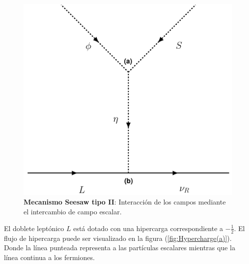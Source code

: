 \documentclass[12pt]{article}
\begin{document}
\begin{figure}[h!]
  \begin{center}
  \includegraphics[scale=0.6]{DiracSeeSAWdiagram.pdf}
\caption{{\textbf{Mecanismo Seesaw tipo II}: Interacción de los campos mediante el intercambio de campo escalar.}}
\label{fig:Majorana}
\end{center}
\end{figure}


El doblete leptónico $L$ está dotado con una hipercarga correspondiente a $-\frac{1}{2}$. El flujo de hipercarga puede ser visualizado en la figura (\ref{fig:Hypercharge(a)}). Donde la línea punteada representa a las partículas escalares mientras que la línea continua a los fermiones. 
\end{document}
